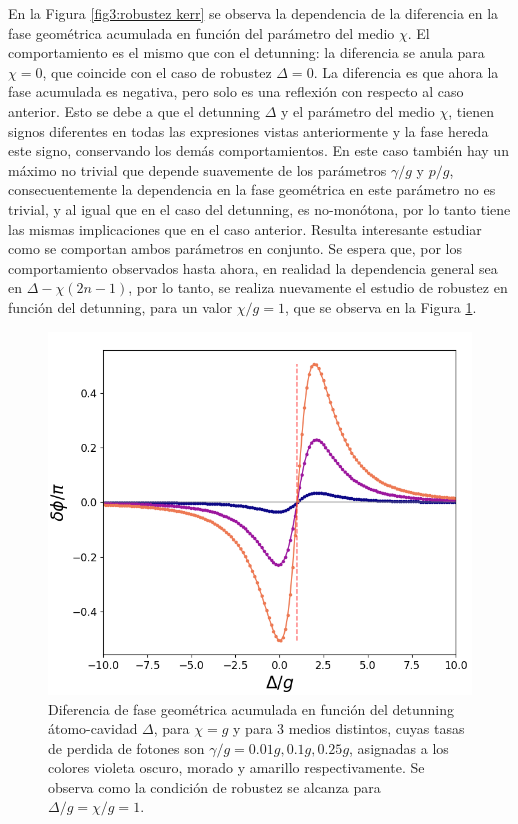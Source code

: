 En la Figura \ref{fig3:robustez kerr} se observa la dependencia de la diferencia en la fase geométrica acumulada en función del parámetro del medio $\chi$. El comportamiento es el mismo que con el detunning: la diferencia se anula para $\chi=0$, que coincide con el caso de robustez $\Delta=0$. La diferencia es que ahora la fase acumulada es negativa, pero solo es una reflexión con respecto al caso anterior. Esto se debe a que el detunning $\Delta$ y el parámetro del medio $\chi$, tienen signos diferentes en todas las expresiones vistas anteriormente y la fase hereda este signo, conservando los demás comportamientos. En este caso también hay un máximo no trivial que depende suavemente de los parámetros $\gamma/g$ y $p/g$, consecuentemente la dependencia en la fase geométrica en este parámetro no es trivial, y al igual que en el caso del detunning, es no-monótona, por lo tanto tiene las mismas implicaciones que en el caso anterior. Resulta interesante estudiar como se comportan ambos parámetros en conjunto. Se espera que, por los comportamiento observados hasta ahora, en realidad la dependencia general sea en $\Delta-\chi(2n-1)$, por lo tanto, se realiza nuevamente el estudio de robustez en función del detunning, para un valor $\chi/g=1$, que se observa en la Figura \ref{fig3:robustez mixta}.
\begin{figure}[h]
    \begin{minipage}[c]{0.67\textwidth}
        \includegraphics[width=\textwidth]{figuras/ch3/robustez x=g.png}
    \end{minipage}\hfill
    \begin{minipage}[c]{0.3\textwidth}
    \caption{Diferencia de fase geométrica acumulada en función del detunning átomo-cavidad $\Delta$, para $\chi=g$ y para 3 medios distintos, cuyas tasas de perdida de fotones son $\gamma/g=0.01g,0.1g,0.25g$, asignadas a los colores violeta oscuro, morado y amarillo respectivamente. Se observa como la condición de robustez se alcanza para $\Delta/g=\chi/g=1$.}
    \label{fig3:robustez mixta}
  \end{minipage}
\end{figure}
